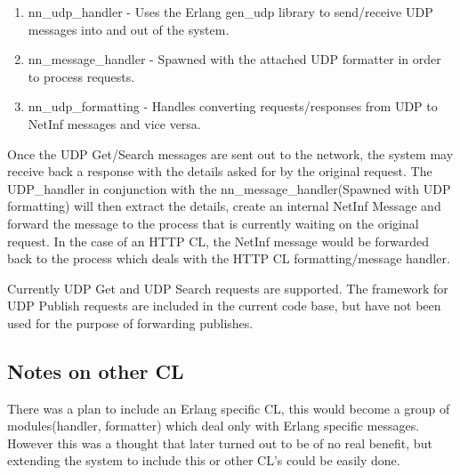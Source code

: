 \begin{enumerate}
\item nn\_udp\_handler - Uses the Erlang gen\_udp library to send/receive UDP messages into and out of the system.
\item nn\_message\_handler - Spawned with the attached UDP formatter in order to process requests.
\item nn\_udp\_formatting - Handles converting requests/responses from UDP to NetInf messages and vice versa.
\end{enumerate}

Once the UDP Get/Search messages are sent out to the network, the system may receive back a response with the details asked for by the original request. The UDP\_handler in conjunction with the nn\_message\_handler(Spawned with UDP formatting) will then extract the details, create an internal NetInf Message and forward the message to the process that is currently waiting on the original request. In the case of an HTTP CL, the NetInf message would be forwarded back to the process which deals with the HTTP CL formatting/message handler.

Currently UDP Get and UDP Search requests are supported. The framework for UDP Publish requests are included in the current code base, but have not been used for the purpose of forwarding publishes. 

\subsection {Notes on other CL}

There was a plan to include an Erlang specific CL, this would become a group of modules(handler, formatter) which deal only with Erlang specific messages. However this was a thought that later turned out to be of no real benefit, but extending the system to include this or other CL's could be easily done. 
